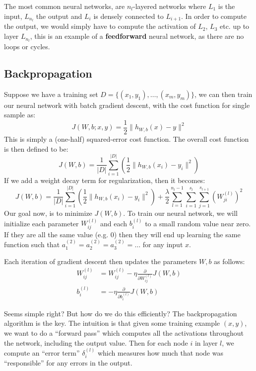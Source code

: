     The most common neural networks, are $n_l$-layered networks where $L_1$ is 
    the input, $L_{n_l}$ the output and $L_i$ is densely connected to 
    $L_{i+1}$. In order to compute the output, we would simply have to compute 
    the activation of $L_2$, $L_3$ etc. up to layer $L_{n_l}$, this is an 
    example of a \textbf{feedforward} neural network, as there are no loops or 
    cycles.
    
    \subsection{Backpropagation}
    Suppose we have a training set $D = \{(x_1,y_1),\dots,(x_m,y_m)\}$, we can 
    then train our neural network with batch gradient descent, with the cost 
    function for single sample as:
    \begin{equation*}
        J(W,b;x,y)=\frac{1}{2}\|h_{W,b}(x)-y\|^2
    \end{equation*} 
    This is simply a (one-half) squared-error cost function. The overall cost 
    function is then defined to be:
    \begin{equation*}
        J(W,b) = 
        \frac{1}{|D|}\sum_{i=1}^{|D|}\left(\frac{1}{2}\|h_{W,b}(x_i)-y_i\|^2\right)
    \end{equation*}
    If we add a weight decay term for regularization, then it becomes:
    \begin{equation*}
        J(W,b)=\frac{1}{|D|}\sum_{i=1}^{|D|}\left(\frac{1}{2}\|h_{W,b}(x_i)-y_i\|^2\right)
        + \frac{\lambda}{2} 
        \sum_{l=1}^{n_l-1}\sum_{i=1}^{s_l}\sum_{j=1}^{s_{l+1}}\left(W_{ji}^{(l)}\right)^2
    \end{equation*}
    Our goal now, is to minimize $J(W,b)$. To train our neural network, we will 
    initialize each parameter $W_{ij}^{(l)}$ and each $b_i^{(l)}$ to a small 
    random value near zero. If they are all the same value (e.g. $0$) then they 
    will end up learning the same function such that 
    $a_1^{(2)}=a_2^{(2)}=a_3^{(2)}=\dots$ for any input $x$.
    
    Each iteration of gradient descent then updates the parameters $W,b$ as 
    follows:
    \begin{align*}
        W_{ij}^{(l)}&=W_{ij}^{(l)}-\eta \frac{\partial}{\partial 
        W_{ij}^{(l)}}J(W,b)\\
        b_i^{(l)}&=-\eta \frac{\partial}{\partial b_i^{(l)}}J(W,b)
    \end{align*}
    
    Seems simple right? But how do we do this efficiently? The backpropagation 
    algorithm is the key. The intuition is that given some training example 
    $(x,y)$, we want to do a ``forward pass'' which computes all the 
    activations throughout the network, including the output value. Then for 
    each node $i$ in layer $l$, we compute an ``error term'' $\delta_i^{(l)}$ 
    which measures how much that node was ``responsible'' for any errors in the 
    output.
    

